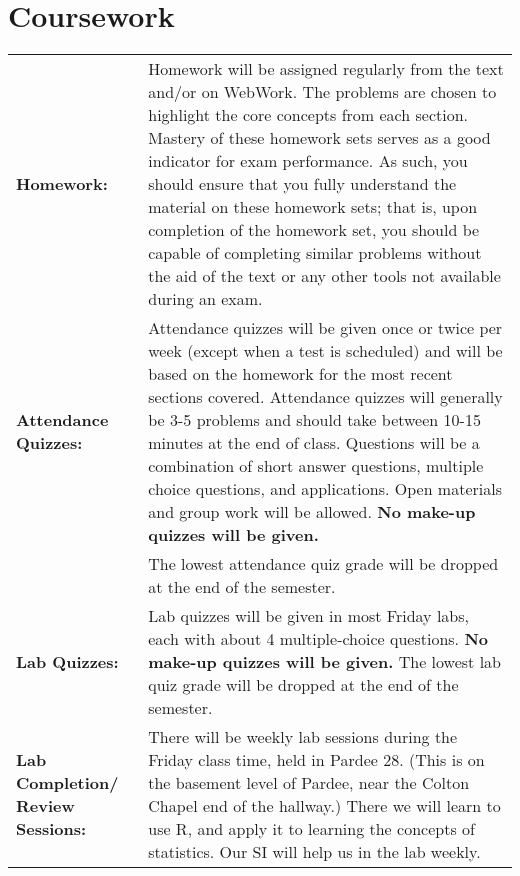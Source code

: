 \documentclass[10pt]{amsart}
\begin{document}
\section*{Coursework}
\noindent
\begin{tabular}{p{1.4in}p{5in}}
  {\bf Homework:} & Homework will be assigned regularly from the text and/or on WebWork.  The problems are chosen to highlight the core concepts from each section.  Mastery of these homework sets serves as a good indicator for exam performance.  As such, you should ensure that you fully understand the material on these homework sets; that is, upon completion of the homework set, you should be capable of completing similar problems without the aid of the text or any other tools not available during an exam.\\
  
  {\bf Attendance Quizzes:} & Attendance quizzes will be given once or twice per week (except when a test is scheduled) and will be based on the homework for the most recent sections covered.  Attendance quizzes will generally be 3-5 problems and should take between 10-15 minutes at the end of class.  Questions will be a combination of short answer questions, multiple choice questions, and applications.  Open materials and group work will be allowed. {\bf No make-up quizzes will be given.}\\
  & The lowest attendance quiz grade will be dropped at the end of the semester.\\
  
  {\bf Lab Quizzes:} & Lab quizzes will be given in most Friday labs, each with about 4 multiple-choice questions. {\bf No make-up quizzes will be given.}  The lowest lab quiz grade will be dropped at the end of the semester.\\
  
  {\bf Lab Completion/ Review Sessions:} & There will be weekly lab sessions during the Friday class time, held in Pardee 28.  (This is on the basement level of Pardee, near the Colton Chapel end of the hallway.) There we will learn to use R, and apply it to learning the concepts of statistics.  Our SI will help us in the lab weekly.\\
\end{tabular}
\end{document}

